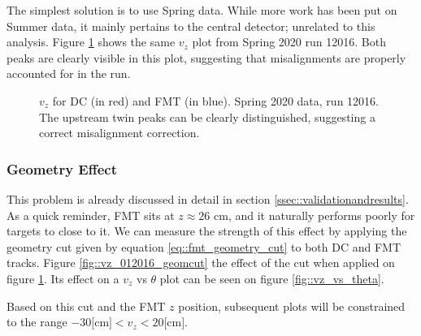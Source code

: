        The simplest solution is to use Spring data.
        While more work has been put on Summer data, it mainly pertains to the central detector; unrelated to this analysis.
        Figure \ref{fig::vz_012016} shows the same $v_z$ plot from Spring 2020 run 12016.
        Both peaks are clearly visible in this plot, suggesting that misalignments are properly accounted for in the run.

        \begin{figure}[t!]
            \centering{}
            \caption[$v_z$ for DC and FMT, run 12016]{$v_z$ for DC (in red) and FMT (in blue). Spring 2020 data, run 12016. The upstream twin peaks can be clearly distinguished, suggesting a correct misalignment correction.}
            \label{fig::vz_012016}
        \end{figure}

    \subsubsection{Geometry Effect}
        This problem is already discussed in detail in section \ref{ssec::validationandresults}.
        As a quick reminder, FMT sits at $z \approx 26$ cm, and it naturally performs poorly for targets to close to it.
        We can measure the strength of this effect by applying the geometry cut given by equation \eqref{eq::fmt_geometry_cut} to both DC and FMT tracks.
        Figure \ref{fig::vz_012016_geomcut} the effect of the cut when applied on figure \ref{fig::vz_012016}.
        Its effect on a $v_z$ vs $\theta$ plot can be seen on figure \ref{fig::vz_vs_theta}.

        Based on this cut and the FMT $z$ position, subsequent plots will be constrained to the range $-30 \text{[cm]} < v_z < 20 \text{[cm]}$.

